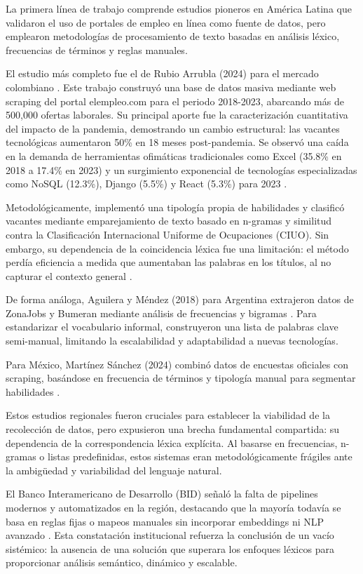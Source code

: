 La primera línea de trabajo comprende estudios pioneros en América Latina que validaron el uso de portales de empleo en línea como fuente de datos, pero emplearon metodologías de procesamiento de texto basadas en análisis léxico, frecuencias de términos y reglas manuales.

El estudio más completo fue el de Rubio Arrubla (2024) para el mercado colombiano \cite{rubio2025}. Este trabajo construyó una base de datos masiva mediante web scraping del portal elempleo.com para el periodo 2018-2023, abarcando más de 500,000 ofertas laborales. Su principal aporte fue la caracterización cuantitativa del impacto de la pandemia, demostrando un cambio estructural: las vacantes tecnológicas aumentaron 50\% en 18 meses post-pandemia. Se observó una caída en la demanda de herramientas ofimáticas tradicionales como Excel (35.8\% en 2018 a 17.4\% en 2023) y un surgimiento exponencial de tecnologías especializadas como NoSQL (12.3\%), Django (5.5\%) y React (5.3\%) para 2023 \cite{rubio2025}.

Metodológicamente, implementó una tipología propia de habilidades y clasificó vacantes mediante emparejamiento de texto basado en n-gramas y similitud contra la Clasificación Internacional Uniforme de Ocupaciones (CIUO). Sin embargo, su dependencia de la coincidencia léxica fue una limitación: el método perdía eficiencia a medida que aumentaban las palabras en los títulos, al no capturar el contexto general \cite{rubio2025}.

De forma análoga, Aguilera y Méndez (2018) para Argentina extrajeron datos de ZonaJobs y Bumeran mediante análisis de frecuencias y bigramas \cite{aguilera2018}. Para estandarizar el vocabulario informal, construyeron una lista de palabras clave semi-manual, limitando la escalabilidad y adaptabilidad a nuevas tecnologías.

Para México, Martínez Sánchez (2024) combinó datos de encuestas oficiales con scraping, basándose en frecuencia de términos y tipología manual para segmentar habilidades \cite{martinez2024}.

Estos estudios regionales fueron cruciales para establecer la viabilidad de la recolección de datos, pero expusieron una brecha fundamental compartida: su dependencia de la correspondencia léxica explícita. Al basarse en frecuencias, n-gramas o listas predefinidas, estos sistemas eran metodológicamente frágiles ante la ambigüedad y variabilidad del lenguaje natural.

El Banco Interamericano de Desarrollo (BID) señaló la falta de pipelines modernos y automatizados en la región, destacando que la mayoría todavía se basa en reglas fijas o mapeos manuales sin incorporar embeddings ni NLP avanzado \cite{echeverria2022}. Esta constatación institucional refuerza la conclusión de un vacío sistémico: la ausencia de una solución que superara los enfoques léxicos para proporcionar análisis semántico, dinámico y escalable.


